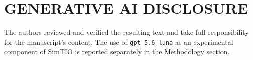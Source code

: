 \documentclass{trbunofficial}
\begin{document}
\section*{GENERATIVE AI DISCLOSURE}
The authors reviewed and verified the
resulting text and take full responsibility for the manuscript's content. The
use of \texttt{gpt-5.6-luna} as an experimental component of SimTIO is reported
separately in the Methodology section.






\newpage


\end{document}
